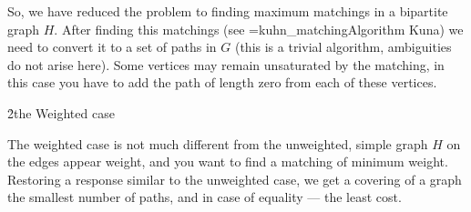 So, we have reduced the problem to finding maximum matchings in a bipartite graph $H$. After finding this matchings (see \algohref=kuhn_matching{Algorithm Kuna}) we need to convert it to a set of paths in $G$ (this is a trivial algorithm, ambiguities do not arise here). Some vertices may remain unsaturated by the matching, in this case you have to add the path of length zero from each of these vertices.


\h2{the Weighted case}

The weighted case is not much different from the unweighted, simple graph $H$ on the edges appear weight, and you want to find a matching of minimum weight. Restoring a response similar to the unweighted case, we get a covering of a graph the smallest number of paths, and in case of equality --- the least cost.